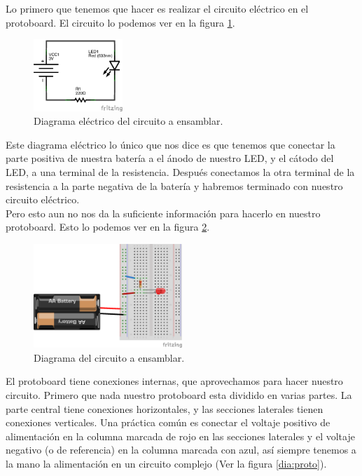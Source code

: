     Lo primero que tenemos que hacer es realizar el circuito eléctrico en el protoboard. El circuito lo podemos ver en la figura \ref{dia:elecir}. \\

    \begin{figure}[h]
    	\begin{center}
    		\includegraphics[width=0.3\textwidth]{images/LED-bateria-diagrama.png}
    		\caption{Diagrama eléctrico del circuito a ensamblar.}
    		\label{dia:elecir}
    	\end{center}
    \end{figure}

    Este diagrama eléctrico lo único que nos dice es que tenemos que conectar la parte positiva de nuestra batería a el ánodo de nuestro LED, y el cátodo del LED, a una terminal de la resistencia. Después conectamos la otra terminal de la resistencia a la parte negativa de la batería y habremos terminado con nuestro circuito eléctrico. \\

    Pero esto aun no nos da la suficiente información para hacerlo en nuestro protoboard. Esto lo podemos ver en la figura \ref{dia:cir}. \\

    \begin{figure}[h]
    	\begin{center}
    		\includegraphics[width=0.5\textwidth]{images/LED-bateria.png}
    		\caption{Diagrama del circuito a ensamblar.}
    		\label{dia:cir}
    	\end{center}
    \end{figure}

    El protoboard tiene conexiones internas, que aprovechamos para hacer nuestro circuito. Primero que nada nuestro protoboard esta dividido en varias partes. La parte central tiene conexiones horizontales, y las secciones laterales tienen conexiones verticales. Una práctica común es conectar el voltaje positivo de alimentación en la columna marcada de rojo en las secciones laterales y el voltaje negativo (o de referencia) en la columna marcada con azul, así siempre tenemos a la mano la alimentación en un circuito complejo (Ver la figura \ref{dia:proto}). \\


